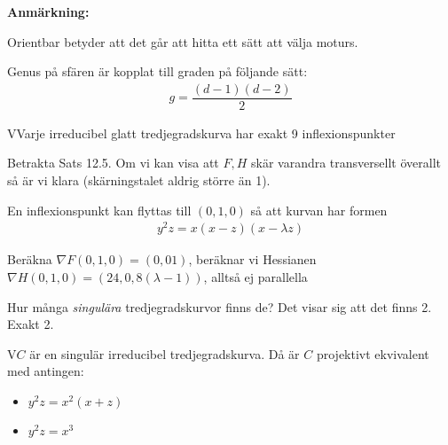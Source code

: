 \par\bigskip
\noindent\textbf{Anmärkning:}\par
\noindent Orientbar betyder att det går att hitta ett sätt att välja moturs.
\par\bigskip
\noindent Genus på sfären är kopplat till graden på följande sätt:
\begin{equation*}
  \begin{gathered}
    g = \dfrac{(d-1)(d-2)}{2}
  \end{gathered}
\end{equation*}
\par\bigskip
\begin{theo}
  VVarje irreducibel glatt tredjegradskurva har exakt 9 inflexionspunkter
\end{theo}\par
\noindent Betrakta Sats 12.5. Om vi kan visa att $F,H$ skär varandra transversellt överallt så är vi klara (skärningstalet aldrig större än 1).\par
\noindent En inflexionspunkt kan flyttas till $(0,1,0)$ så att kurvan har formen
\begin{equation*}
  \begin{gathered}
    y^2z=x(x-z)(x-\lambda z)
  \end{gathered}
\end{equation*}\par
\noindent Beräkna $\nabla F(0,1,0)  = (0,01)$, beräknar vi Hessianen $\nabla H(0,1,0) = (24,0,8(\lambda-1))$, alltså ej parallella
\par\bigskip
\noindent Hur många \textit{singulära} tredjegradskurvor finns de? Det visar sig att det finns 2. Exakt 2.
\par\bigskip
\begin{theo}
  V$C$ är en singulär irreducibel tredjegradskurva. Då är $C$ projektivt ekvivalent med antingen:
  \begin{itemize}
    \item $y^2z = x^2(x+z)$
    \item $y^2z=x^3$
  \end{itemize}
\end{theo}
